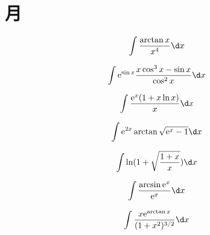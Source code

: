 \section{月}

\begin{question}
    \begin{equation*}
        \int\frac{\arctan x}{x^4} \d x
    \end{equation*}
\end{question}

\begin{question}
    \begin{equation*}
        \int \mathrm{e}^{ \sin x } \frac{ x \cos^3 x - \sin x }{ \cos^2 x } \d x
    \end{equation*}
\end{question}

\begin{question}
    \begin{equation*}
        \int \frac{ \mathrm{e}^x ( 1 + x \ln x ) }{ x } \d x
    \end{equation*}
\end{question}

\begin{question}
    \begin{equation*}
        \int \mathrm{e}^{2x} \arctan \sqrt{ \mathrm{e}^x - 1 } \d x
    \end{equation*}
\end{question}

\begin{question}
    \begin{equation*}
        \int \ln(1 + \sqrt{\frac{1 + x}{x}}) \d x
    \end{equation*}
\end{question}

\begin{question}
    \begin{equation*}
        \int \frac{\arcsin \mathrm{e}^x}{\mathrm{e}^x} \d x
    \end{equation*}
\end{question}

\begin{question}
    \begin{equation*}
        \int \frac{x \mathrm{e}^{\arctan x}}{(1 + x^2)^{3/2}} \d x
    \end{equation*}
\end{question}

